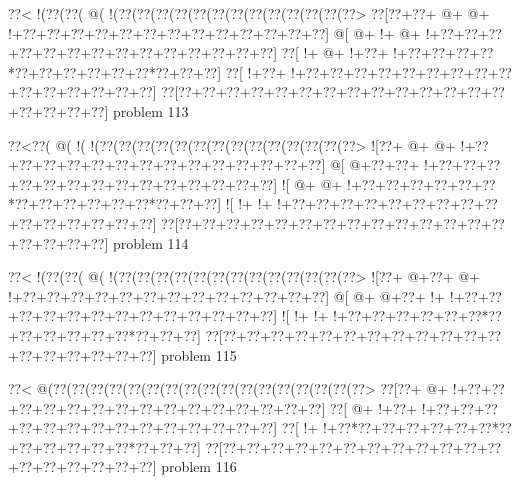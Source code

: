 \vbox{\vbox{\goo
\0??<\- !(\0??(\0??(\- @(\- !(\0??(\0??(\0??(\0??(\0??(\0??(\0??(\0??(\0??(\0??(\0??(\0??(\0??>
\0??[\0??+\0??+\- @+\- @+\- !+\0??+\0??+\0??+\0??+\0??+\0??+\0??+\0??+\0??+\0??+\0??+\0??+\0??]
\- @[\- @+\- !+\- @+\- !+\0??+\0??+\0??+\0??+\0??+\0??+\0??+\0??+\0??+\0??+\0??+\0??+\0??+\0??]
\0??[\- !+\- @+\- !+\0??+\- !+\0??+\0??+\0??+\0??*\0??+\0??+\0??+\0??+\0??+\0??*\0??+\0??+\0??]
\0??[\- !+\0??+\- !+\0??+\0??+\0??+\0??+\0??+\0??+\0??+\0??+\0??+\0??+\0??+\0??+\0??+\0??+\0??]
\0??[\0??+\0??+\0??+\0??+\0??+\0??+\0??+\0??+\0??+\0??+\0??+\0??+\0??+\0??+\0??+\0??+\0??+\0??]
}
\hfil problem 113\hfil\break
}



\vbox{\vbox{\goo
\0??<\0??(\- @(\- !(\- !(\0??(\0??(\0??(\0??(\0??(\0??(\0??(\0??(\0??(\0??(\0??(\0??(\0??(\0??>
\- ![\0??+\- @+\- @+\- !+\0??+\0??+\0??+\0??+\0??+\0??+\0??+\0??+\0??+\0??+\0??+\0??+\0??+\0??]
\- @[\- @+\0??+\0??+\- !+\0??+\0??+\0??+\0??+\0??+\0??+\0??+\0??+\0??+\0??+\0??+\0??+\0??+\0??]
\- ![\- @+\- @+\- !+\0??+\0??+\0??+\0??+\0??+\0??*\0??+\0??+\0??+\0??+\0??+\0??*\0??+\0??+\0??]
\- ![\- !+\- !+\- !+\0??+\0??+\0??+\0??+\0??+\0??+\0??+\0??+\0??+\0??+\0??+\0??+\0??+\0??+\0??]
\0??[\0??+\0??+\0??+\0??+\0??+\0??+\0??+\0??+\0??+\0??+\0??+\0??+\0??+\0??+\0??+\0??+\0??+\0??]
}
\hfil problem 114\hfil\break
}



\vbox{\vbox{\goo
\0??<\- !(\0??(\0??(\- @(\- !(\0??(\0??(\0??(\0??(\0??(\0??(\0??(\0??(\0??(\0??(\0??(\0??(\0??>
\- ![\0??+\- @+\0??+\- @+\- !+\0??+\0??+\0??+\0??+\0??+\0??+\0??+\0??+\0??+\0??+\0??+\0??+\0??]
\- @[\- @+\- @+\0??+\- !+\- !+\0??+\0??+\0??+\0??+\0??+\0??+\0??+\0??+\0??+\0??+\0??+\0??+\0??]
\- ![\- !+\- !+\- !+\0??+\0??+\0??+\0??+\0??+\0??*\0??+\0??+\0??+\0??+\0??+\0??*\0??+\0??+\0??]
\0??[\0??+\0??+\0??+\0??+\0??+\0??+\0??+\0??+\0??+\0??+\0??+\0??+\0??+\0??+\0??+\0??+\0??+\0??]
}
\hfil problem 115\hfil\break
}



\vbox{\vbox{\goo
\0??<\- @(\0??(\0??(\0??(\0??(\0??(\0??(\0??(\0??(\0??(\0??(\0??(\0??(\0??(\0??(\0??(\0??(\0??>
\0??[\0??+\- @+\- !+\0??+\0??+\0??+\0??+\0??+\0??+\0??+\0??+\0??+\0??+\0??+\0??+\0??+\0??+\0??]
\0??[\- @+\- !+\0??+\- !+\0??+\0??+\0??+\0??+\0??+\0??+\0??+\0??+\0??+\0??+\0??+\0??+\0??+\0??]
\0??[\- !+\- !+\0??*\0??+\0??+\0??+\0??+\0??+\0??*\0??+\0??+\0??+\0??+\0??+\0??*\0??+\0??+\0??]
\0??[\0??+\0??+\0??+\0??+\0??+\0??+\0??+\0??+\0??+\0??+\0??+\0??+\0??+\0??+\0??+\0??+\0??+\0??]
}
\hfil problem 116\hfil\break
}



